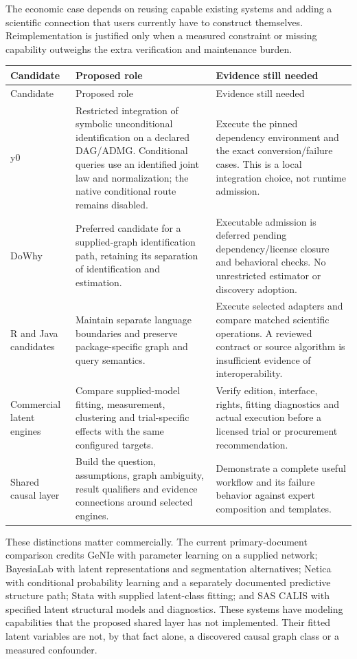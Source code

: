 The economic case depends on reusing capable existing systems and adding
a scientific connection that users currently have to construct
themselves. Reimplementation is justified only when a measured
constraint or missing capability outweighs the extra verification and
maintenance burden.

\begin{longtable}{@{}p{.19\linewidth}p{.37\linewidth}p{.36\linewidth}@{}}
\toprule
Candidate & Proposed role & Evidence still needed \\
\midrule
\endfirsthead
\toprule
Candidate & Proposed role & Evidence still needed \\
\midrule
\endhead
y0 & Restricted integration of symbolic unconditional identification on a declared DAG/ADMG. Conditional queries use an identified joint law and normalization; the native conditional route remains disabled. & Execute the pinned dependency environment and the exact conversion/failure cases. This is a local integration choice, not runtime admission. \\
DoWhy & Preferred candidate for a supplied-graph identification path, retaining its separation of identification and estimation. & Executable admission is deferred pending dependency/license closure and behavioral checks. No unrestricted estimator or discovery adoption. \\
R and Java candidates & Maintain separate language boundaries and preserve package-specific graph and query semantics. & Execute selected adapters and compare matched scientific operations. A reviewed contract or source algorithm is insufficient evidence of interoperability. \\
Commercial latent engines & Compare supplied-model fitting, measurement, clustering and trial-specific effects with the same configured targets. & Verify edition, interface, rights, fitting diagnostics and actual execution before a licensed trial or procurement recommendation. \\
Shared causal layer & Build the question, assumptions, graph ambiguity, result qualifiers and evidence connections around selected engines. & Demonstrate a complete useful workflow and its failure behavior against expert composition and templates. \\
\bottomrule
\end{longtable}

\citep{sp13_choices,sp13_interfaces}

These distinctions matter commercially. The current primary-document
comparison credits GeNIe with parameter learning on a supplied network;
BayesiaLab with latent representations and segmentation alternatives;
Netica with conditional probability learning and a separately documented
predictive structure path; Stata with supplied latent-class fitting; and
SAS CALIS with specified latent structural models and diagnostics. These
systems have modeling capabilities that the proposed shared layer has
not implemented. Their fitted latent variables are not, by that fact
alone, a discovered causal graph class or a measured confounder.
\citep{exec13_latent_genie_parameters,
exec13_latent_bayesia_data,exec13_latent_netica_algorithms,
exec13_latent_stata_lca,exec13_latent_sas_calis}

